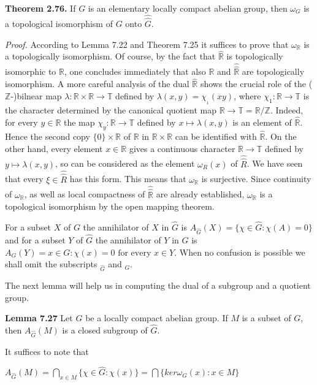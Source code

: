 \documentclass[12pt]{article}
\begin{document}
\textbf{Theorem 2.76.} If $G$ is an elementary locally compact abelian group, then $\omega_G$ is a topological isomorphism of
$G$ onto $\hat{\hat{G}}$.


\emph{Proof.} According to Lemma 7.22 and Theorem 7.25 it suffices to prove that $\omega_{\mathbb{R}}$ is a topologically isomorphism.
Of course, by the fact that $\hat{\mathbb{R}}$ is topologically isomorphic to $\mathbb{R}$, one concludes immediately that also $\mathbb{R}$ and $\hat{\hat{\mathbb{R}}}$
are topologically isomorphism. A more careful analysis of the dual $\hat{\mathbb{R}}$ shows the crucial role of the ($\mathbb{Z}$-)bilnear
map $\lambda : \mathbb{R} \times \mathbb{R} \to \mathbb{T}$ defined by $λ(x, y) = \chi__1(xy)$, where $\chi_1 : \mathbb{R} \to \mathbb{T}$ is the character determined by the canonical
quotient map $\mathbb{R} \to \mathbb{T} = \mathbb{R}/\mathbb{Z}$. Indeed, for every $y \in \mathbb{R}$ the map $\chi_y : \mathbb{R} \to \mathbb{T}$ defined by $x \mapsto \lambda(x, y)$ is an element
of $\hat{\mathbb{R}}$. Hence the second copy $\{0\} \times \mathbb{R}$ of $\mathbb{R}$ in $\mathbb{R} \times \mathbb{R}$ can be identified with $\hat{\mathbb{R}}$. On the other hand, every element
$x \in \mathbb{R}$ gives a continuous character $\mathbb{R} \to \mathbb{T}$ defined by $y \mapsto \lambda(x, y)$, so can be considered as the element $\omega_R(x)$ of
$\hat{\hat{R}}$. We have seen that every $\xi \in \hat{\hat{R}}$ has this form. This means that $\omega_{\mathbb{R}}$ is surjective. Since continuity of $\omega_{\mathbb{R}}$, as
well as local compactness of $\hat{\hat{\mathbb{R}}}$ are already established, $\omega_{\mathbb{R}}$ is a topological isomorphism by the open mapping
theorem.


    For a subset $X$ of $G$ the annihilator of $X$ in $\hat{G}$ is $A_{\hat{G}}(X) = \{\chi \in \hat{G} : \chi(A) = {0}\}$ and for a subset $Y$ of $\hat{G}$
the annihilator of $Y$ in $G$ is $A_G(Y ) = {x \in G : \chi(x) = 0 \text{ for every } x \in Y }$. When no confusion is possible we
shall omit the subscripts $_{\hat{G}}$ and $_G$.


    The next lemma will help us in computing the dual of a subgroup and a quotient group.


\textbf{Lemma 7.27} Let $G$ be a locally compact abelian group. If $M$ is a subset of $G$, then $A_{\hat{G}} (M)$ is a closed subgroup
of $\hat{G}$.


     It suffices to note that


        $A_{\hat{G}}(M) = \bigcap_{x \in M} \{ \chi \in \hat{G} : \chi(x) \} = \bigcap\{ker \omega_G(x) : x \in M \}$
\end{document}
